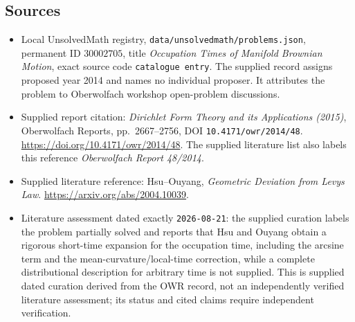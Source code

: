 \documentclass[11pt]{article}
\begin{document}
\subsection{Sources}
\begin{itemize}
\item Local UnsolvedMath registry, \texttt{data/unsolvedmath/problems.json}, permanent ID \(30002705\), title \emph{Occupation Times of Manifold Brownian Motion}, exact source code \texttt{catalogue entry}. The supplied record assigns proposed year 2014 and names no individual proposer. It attributes the problem to Oberwolfach workshop open-problem discussions.
\item Supplied report citation: \emph{Dirichlet Form Theory and its Applications (2015)}, Oberwolfach Reports, pp.\ 2667--2756, DOI \texttt{10.4171/owr/2014/48}. \url{https://doi.org/10.4171/owr/2014/48}. The supplied literature list also labels this reference \emph{Oberwolfach Report 48/2014}.
\item Supplied literature reference: Hsu--Ouyang, \emph{Geometric Deviation from Levys Law}. \url{https://arxiv.org/abs/2004.10039}.
\item Literature assessment dated exactly \texttt{2026-08-21}: the supplied curation labels the problem partially solved and reports that Hsu and Ouyang obtain a rigorous short-time expansion for the occupation time, including the arcsine term and the mean-curvature/local-time correction, while a complete distributional description for arbitrary time is not supplied. This is supplied dated curation derived from the OWR record, not an independently verified literature assessment; its status and cited claims require independent verification.
\end{itemize}
\end{document}
